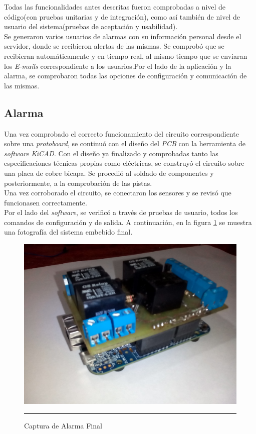 Todas las funcionalidades antes descritas fueron comprobadas a nivel de código(con pruebas unitarias y de integración), como así también de nivel de usuario del sistema(pruebas de aceptación y usabilidad).\\
Se generaron varios usuarios de alarmas con su información personal desde el servidor, donde se recibieron alertas de las mismas. Se comprobó que se recibieran automáticamente y en tiempo real, al mismo tiempo que se enviaran los \textit{E-mails} correspondiente a los usuarios.Por el lado de la aplicación y la alarma, se comprobaron todas las opciones de configuración y comunicación de las mismas.

\newpage
\subsection{Alarma}

Una vez comprobado el correcto funcionamiento del circuito correspondiente sobre una \textit{protoboard}, se continuó con el diseño del \textit{PCB} con la herramienta de \textit{software} \textit{KiCAD}.
Con el diseño ya finalizado y comprobadas tanto las especificaciones técnicas propias como eléctricas, se construyó el circuito sobre una placa de cobre bicapa. Se procedió al soldado de componentes y posteriormente, a la comprobación de las pistas.\\
Una vez corroborado el circuito, se conectaron los sensores y se revisó que funcionasen correctamente.\\
Por el lado del \textit{software}, se verificó a través de pruebas de usuario, todos los comandos de configuración y de salida. A continuación, en la figura \ref{alarma} se muestra una fotografía del sistema embebido final.

\begin{figure}[htbp]
	\centering
		\includegraphics[width=1\textwidth]{Figures/alarma.jpg}
		\rule{35em}{1.5pt}
	\caption[Captura de Alarma final]{Captura de Alarma Final}
\label{alarma}
\end{figure}

